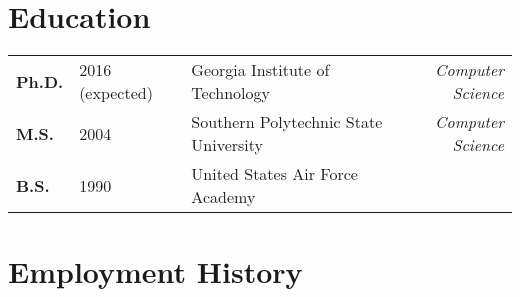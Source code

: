 \documentclass[12pt]{gatech-thesis}
\begin{document}
\begin{postliminary}
{}
\begin{vita}

\section{Education}

\begin{tabular}{lllr}
\textbf{Ph.D.} & 2016 (expected) & Georgia Institute of Technology &
{\sl Computer Science}\\
\textbf{M.S.} &  2004 & Southern Polytechnic State University &
{\sl Computer Science}\\
\textbf{B.S.} & 1990 & United States Air Force Academy & \\
\end{tabular}

\section{Employment History}

\begin{tabular}{llr}


\end{tabular}
\end{vita}
\end{postliminary}
\end{document}
